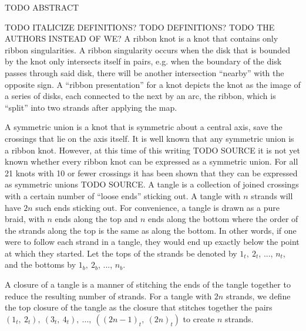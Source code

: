 

\begin{paperabstract}
TODO ABSTRACT
\end{paperabstract}
\begin{paper}
\theorems
TODO ITALICIZE DEFINITIONS?
TODO DEFINITIONS?
TODO THE AUTHORS INSTEAD OF WE?
A ribbon knot is a knot that contains only ribbon singularities.
A ribbon singularity occurs when the disk that is bounded by the knot only
intersects itself in pairs, e.g. when the boundary of the disk passes through
said disk, there will be another intersection ``nearby'' with the opposite sign.
A ``ribbon presentation'' for a knot depicts the knot as the image of a series
of disks, each connected to the next by an arc, the ribbon, which is ``split''
into two strands after applying the map.

A symmetric union is a knot that is symmetric about a central axis, save the
crossings that lie on the axis itself.
It is well known that any symmetric union is a ribbon knot.
However, at this time of this writing TODO SOURCE it is not yet known whether
every ribbon knot can be expressed as a symmetric union.
For all 21 knots with 10 or fewer crossings it has been shown that they can be
expressed as symmetric unions TODO SOURCE.
A tangle is a collection of joined crossings with a certain number of ``loose
ends'' sticking out.
A tangle with $n$ strands will have $2n$ such ends sticking out.
For convenience, a tangle is drawn as a pure braid, with $n$ ends along the top
and $n$ ends along the bottom where the order of the strands along the top is
the same as along the bottom.
In other words, if one were to follow each strand in a tangle, they would end up
exactly below the point at which they started.
Let the tops of the strands be denoted by $1_t,~2_t$, ..., $n_t$, and the
bottoms  by $1_b,~2_b$, ..., $n_b$.


A closure of a tangle is a manner of stitching the ends of the tangle together
to reduce the resulting number of strands.
For a tangle with $2n$ strands, we define the top closure of the tangle as the
closure that stitches together the pairs
$(1_t,~2_t),~(3_t,~4_t),~...,~((2n-1)_t,~(2n)_t)$ to create $n$ strands.


\end{paper}
